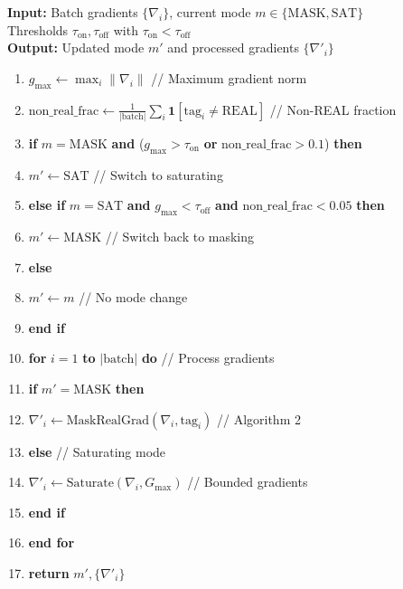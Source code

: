 \documentclass[twoside,11pt]{article}
\begin{document}
\begin{tcolorbox}[colback=gray!5!white,colframe=gray!75!black,title=\textbf{Algorithm 3: Hybrid Gradient Policy with Hysteresis}]
\textbf{Input:} Batch gradients $\{\nabla_i\}$, current mode $m \in \{\text{MASK}, \text{SAT}\}$ \\
 Thresholds $\tau_{\text{on}}, \tau_{\text{off}}$ with $\tau_{\text{on}} < \tau_{\text{off}}$ \\
\textbf{Output:} Updated mode $m'$ and processed gradients $\{\nabla'_i\}$

\begin{enumerate}
\item $g_{\max} \leftarrow \max_i \|\nabla_i\|$ \hfill // Maximum gradient norm
\item $\text{non\_real\_frac} \leftarrow \frac{1}{|\text{batch}|} \sum_i \mathbf{1}[\text{tag}_i \neq \text{REAL}]$ \hfill // Non-REAL fraction
\item \textbf{if} $m = \text{MASK}$ \textbf{and} ($g_{\max} > \tau_{\text{on}}$ \textbf{or} $\text{non\_real\_frac} > 0.1$) \textbf{then}
\item \quad $m' \leftarrow \text{SAT}$ \hfill // Switch to saturating
\item \textbf{else if} $m = \text{SAT}$ \textbf{and} $g_{\max} < \tau_{\text{off}}$ \textbf{and} $\text{non\_real\_frac} < 0.05$ \textbf{then}
\item \quad $m' \leftarrow \text{MASK}$ \hfill // Switch back to masking
\item \textbf{else}
\item \quad $m' \leftarrow m$ \hfill // No mode change
\item \textbf{end if}
\item \textbf{for} $i = 1$ \textbf{to} $|\text{batch}|$ \textbf{do} \hfill // Process gradients
\item \quad \textbf{if} $m' = \text{MASK}$ \textbf{then}
\item \quad \quad $\nabla'_i \leftarrow \text{MaskRealGrad}(\nabla_i, \text{tag}_i)$ \hfill // Algorithm 2
\item \quad \textbf{else} \hfill // Saturating mode
\item \quad \quad $\nabla'_i \leftarrow \text{Saturate}(\nabla_i, G_{\max})$ \hfill // Bounded gradients
\item \quad \textbf{end if}
\item \textbf{end for}
\item \textbf{return} $m', \{\nabla'_i\}$
\end{enumerate}
\end{tcolorbox}
\end{document}
